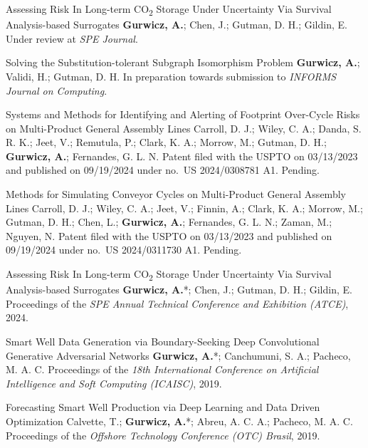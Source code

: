 
\cvpublication
    {Assessing Risk In Long-term CO\textsubscript{2} Storage Under Uncertainty Via Survival Analysis-based Surrogates}
    {\textbf{Gurwicz, A.}; Chen, J.; Gutman, D. H.; Gildin, E.}
    {Under review at \textit{SPE Journal}.}

\cvpublication
    {Solving the Substitution-tolerant Subgraph Isomorphism Problem}
    {\textbf{Gurwicz, A.}; Validi, H.; Gutman, D. H.}
    {In preparation towards submission to \textit{INFORMS Journal on Computing}.}


\cvpublication
    {Systems and Methods for Identifying and Alerting of Footprint Over-Cycle Risks on Multi-Product General Assembly
    Lines}
    {Carroll, D. J.; Wiley, C. A.; Danda, S. R. K.; Jeet, V.; Remutula, P.; Clark, K. A.; Morrow, M.; Gutman, D. H.;
    \textbf{Gurwicz, A.}; Fernandes, G. L. N.}
    {Patent filed with the USPTO on 03/13/2023 and published on 09/19/2024 under no.\ US 2024/0308781 A1. Pending.}

\cvpublication
    {Methods for Simulating Conveyor Cycles on Multi-Product General Assembly Lines}
    {Carroll, D. J.; Wiley, C. A.; Jeet, V.; Finnin, A.; Clark, K. A.; Morrow, M.; Gutman, D. H.; Chen, L.;
    \textbf{Gurwicz, A.}; Fernandes, G. L. N.; Zaman, M.; Nguyen, N.}
    {Patent filed with the USPTO on 03/13/2023 and published on 09/19/2024 under no.\ US 2024/0311730 A1. Pending.}


\cvpublication
    {Assessing Risk In Long-term CO\textsubscript{2} Storage Under Uncertainty Via Survival Analysis-based Surrogates}
    {\textbf{Gurwicz, A.}*; Chen, J.; Gutman, D. H.; Gildin, E.}
    {Proceedings of the \textit{SPE Annual Technical Conference and Exhibition (ATCE)}, 2024.
    }

\cvpublication
    {Smart Well Data Generation via Boundary-Seeking Deep Convolutional Generative Adversarial Networks}
    {\textbf{Gurwicz, A.}*; Canchumuni, S. A.; Pacheco, M. A. C.}
    {Proceedings of the \textit{18th International Conference on Artificial Intelligence and Soft Computing (ICAISC)},
    2019. }

\cvpublication
    {Forecasting Smart Well Production via Deep Learning and Data Driven Optimization}
    {Calvette, T.; \textbf{Gurwicz, A.}*; Abreu, A. C. A.; Pacheco, M. A. C.}
    {Proceedings of the \textit{Offshore Technology Conference (OTC) Brasil}, 2019. }

